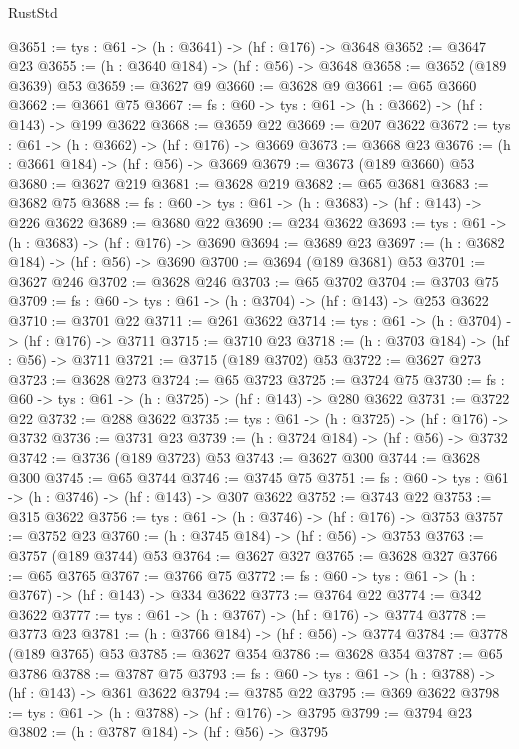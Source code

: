 \begin{lexlean}{RustStd}
\begin{coremodule}
{\begin{coremodule}
{{{{{{{{{{{{{{{{{{{{{{@3651 := {tys : @61} -> (h : @3641) -> (hf : @176) -> @3648
@3652 := @3647 @23
@3655 := (h : @3640 @184) -> (hf : @56) -> @3648
@3658 := @3652 (@189 @3639) @53
@3659 := @3627 @9
@3660 := @3628 @9
@3661 := @65 @3660
@3662 := @3661 @75
@3667 := {fs : @60} -> {tys : @61} -> (h : @3662) -> (hf : @143) -> @199 @3622
@3668 := @3659 @22
@3669 := @207 @3622
@3672 := {tys : @61} -> (h : @3662) -> (hf : @176) -> @3669
@3673 := @3668 @23
@3676 := (h : @3661 @184) -> (hf : @56) -> @3669
@3679 := @3673 (@189 @3660) @53
@3680 := @3627 @219
@3681 := @3628 @219
@3682 := @65 @3681
@3683 := @3682 @75
@3688 := {fs : @60} -> {tys : @61} -> (h : @3683) -> (hf : @143) -> @226 @3622
@3689 := @3680 @22
@3690 := @234 @3622
@3693 := {tys : @61} -> (h : @3683) -> (hf : @176) -> @3690
@3694 := @3689 @23
@3697 := (h : @3682 @184) -> (hf : @56) -> @3690
@3700 := @3694 (@189 @3681) @53
@3701 := @3627 @246
@3702 := @3628 @246
@3703 := @65 @3702
@3704 := @3703 @75
@3709 := {fs : @60} -> {tys : @61} -> (h : @3704) -> (hf : @143) -> @253 @3622
@3710 := @3701 @22
@3711 := @261 @3622
@3714 := {tys : @61} -> (h : @3704) -> (hf : @176) -> @3711
@3715 := @3710 @23
@3718 := (h : @3703 @184) -> (hf : @56) -> @3711
@3721 := @3715 (@189 @3702) @53
@3722 := @3627 @273
@3723 := @3628 @273
@3724 := @65 @3723
@3725 := @3724 @75
@3730 := {fs : @60} -> {tys : @61} -> (h : @3725) -> (hf : @143) -> @280 @3622
@3731 := @3722 @22
@3732 := @288 @3622
@3735 := {tys : @61} -> (h : @3725) -> (hf : @176) -> @3732
@3736 := @3731 @23
@3739 := (h : @3724 @184) -> (hf : @56) -> @3732
@3742 := @3736 (@189 @3723) @53
@3743 := @3627 @300
@3744 := @3628 @300
@3745 := @65 @3744
@3746 := @3745 @75
@3751 := {fs : @60} -> {tys : @61} -> (h : @3746) -> (hf : @143) -> @307 @3622
@3752 := @3743 @22
@3753 := @315 @3622
@3756 := {tys : @61} -> (h : @3746) -> (hf : @176) -> @3753
@3757 := @3752 @23
@3760 := (h : @3745 @184) -> (hf : @56) -> @3753
@3763 := @3757 (@189 @3744) @53
@3764 := @3627 @327
@3765 := @3628 @327
@3766 := @65 @3765
@3767 := @3766 @75
@3772 := {fs : @60} -> {tys : @61} -> (h : @3767) -> (hf : @143) -> @334 @3622
@3773 := @3764 @22
@3774 := @342 @3622
@3777 := {tys : @61} -> (h : @3767) -> (hf : @176) -> @3774
@3778 := @3773 @23
@3781 := (h : @3766 @184) -> (hf : @56) -> @3774
@3784 := @3778 (@189 @3765) @53
@3785 := @3627 @354
@3786 := @3628 @354
@3787 := @65 @3786
@3788 := @3787 @75
@3793 := {fs : @60} -> {tys : @61} -> (h : @3788) -> (hf : @143) -> @361 @3622
@3794 := @3785 @22
@3795 := @369 @3622
@3798 := {tys : @61} -> (h : @3788) -> (hf : @176) -> @3795
@3799 := @3794 @23
@3802 := (h : @3787 @184) -> (hf : @56) -> @3795
}}}}}}}}}}}}}}}}}}}}}}
\end{coremodule}}
\end{coremodule}
\end{lexlean}
